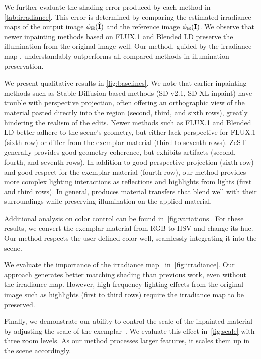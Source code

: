 We further evaluate the shading error produced by each method in \cref{tab:irradiance}. This error is determined by comparing the estimated irradiance maps of the output image $\phi_\mathbf{E}(\hat{\mathbf{I}})$ and the reference image $\phi_\mathbf{E}(\mathbf{I})$. We observe that newer inpainting methods based on FLUX.1 and Blended LD preserve the illumination from the original image well. Our method, guided by the irradiance map \irra{}, understandably outperforms all compared methods in illumination preservation. 


We present qualitative results in \cref{fig:baselines}. We note that earlier inpainting methods such as Stable Diffusion based methods (SD v2.1, SD-XL inpaint) have trouble with perspective projection, often offering an orthographic view of the material pasted directly into the region (second, third, and sixth rows), greatly hindering the realism of the edits. Newer methods such as FLUX.1 and Blended LD better adhere to the scene's geometry, but either lack perspective for FLUX.1 (sixth row) or differ from the exemplar material \exemplar{} (third to seventh rows). ZeST generally provides good geometry coherence, but exhibits artifacts (second, fourth, and seventh rows). In addition to good perspective projection (sixth row) and good respect for the exemplar material \exemplar{} (fourth row), our method \method{} provides more complex lighting interactions as reflections and highlights from lights (first and third rows). In general, \method{} produces material transfers that blend well with their surroundings while preserving illumination on the applied material. 

Additional analysis on color control can be found in~\cref{fig:variations}. For these results, we convert the exemplar material \exemplar{} from RGB to HSV and change its hue. Our method respects the user-defined color well, seamlessly integrating it into the scene. 

We evaluate the importance of the irradiance map~\irra{} in~\cref{fig:irradiance}. Our approach generates better matching shading than previous work, even without the irradiance map. However, high-frequency lighting effects from the original image such as highlights (first to third rows) require the irradiance map to be preserved. 

Finally, we demonstrate our ability to control the scale of the inpainted material by adjusting the scale of the exemplar~\exemplar{}. We evaluate this effect in~\cref{fig:scale} with three zoom levels. As our method processes larger features, it scales them up in the scene accordingly. 


